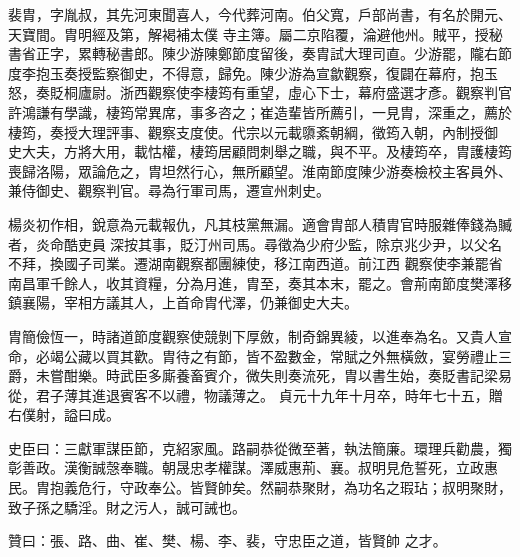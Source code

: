 \begin{pinyinscope}
 裴胄，字胤叔，其先河東聞喜人，今代葬河南。伯父寬，戶部尚書，有名於開元、天寶間。胄明經及第，解褐補太僕
 寺主簿。屬二京陷覆，淪避他州。賊平，授秘書省正字，累轉秘書郎。陳少游陳鄭節度留後，奏胄試大理司直。少游罷，隴右節度李抱玉奏授監察御史，不得意，歸免。陳少游為宣歙觀察，復闢在幕府，抱玉怒，奏貶桐廬尉。浙西觀察使李棲筠有重望，虛心下士，幕府盛選才彥。觀察判官許鴻謙有學識，棲筠常異席，事多咨之；崔造輩皆所薦引，一見胄，深重之，薦於棲筠，奏授大理評事、觀察支度使。代宗以元載隳紊朝綱，徵筠入朝，內制授御
 史大夫，方將大用，載怙權，棲筠居顧問刺舉之職，與不平。及棲筠卒，胄護棲筠喪歸洛陽，眾論危之，胄坦然行心，無所顧望。淮南節度陳少游奏檢校主客員外、兼侍御史、觀察判官。尋為行軍司馬，遷宣州刺史。



 楊炎初作相，銳意為元載報仇，凡其枝黨無漏。適會胄部人積胄官時服雜俸錢為贓者，炎命酷吏員深按其事，貶汀州司馬。尋徵為少府少監，除京兆少尹，以父名不拜，換國子司業。遷湖南觀察都團練使，移江南西道。前江西
 觀察使李兼罷省南昌軍千餘人，收其資糧，分為月進，胄至，奏其本末，罷之。會荊南節度樊澤移鎮襄陽，宰相方議其人，上首命胄代澤，仍兼御史大夫。



 胄簡儉恆一，時諸道節度觀察使競剝下厚斂，制奇錦異綾，以進奉為名。又貴人宣命，必竭公藏以買其歡。胄待之有節，皆不盈數金，常賦之外無橫斂，宴勞禮止三爵，未嘗酣樂。時武臣多廝養畜賓介，微失則奏流死，胄以書生始，奏貶書記梁易從，君子薄其進退賓客不以禮，物議薄之。
 貞元十九年十月卒，時年七十五，贈右僕射，謚曰成。



 史臣曰：三獻軍謀臣節，克紹家風。路嗣恭從微至著，執法簡廉。環理兵勸農，獨彰善政。漢衡誠愨奉職。朝晟忠孝權謀。澤威惠荊、襄。叔明見危誓死，立政惠民。胄抱義危行，守政奉公。皆賢帥矣。然嗣恭聚財，為功名之瑕玷；叔明聚財，致子孫之驕淫。財之污人，誠可誡也。



 贊曰：張、路、曲、崔、樊、楊、李、裴，守忠臣之道，皆賢帥
 之才。



\end{pinyinscope}